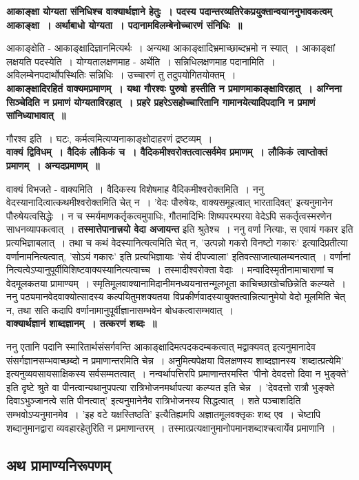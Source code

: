 	{\bfseries आकाङ्क्षा योग्यता संनिधिश्च वाक्यार्थज्ञाने हेतुः~। पदस्य पदान्तरव्यतिरेकप्रयुक्तान्वयाननुभावकत्वम् आकाङ्क्षा~। अर्थाबाधो योग्यता~। पदानामविलम्बेनोच्चारणं संनिधिः~॥}\par
		आकाङ्क्षेति - आकाङ्क्षादिज्ञानमित्यर्थः~। अन्यथा आकाङ्क्षादिभ्रमाच्छाब्दभ्रमो न स्यात्~। आकाङ्क्षां लक्षयति पदस्येति~। योग्यतालक्षणमाह - अर्थेति~। सन्निधिलक्षणमाह पदानामिति~। अविलम्बेनपदार्थोपस्थितिः सन्निधिः~। उच्चारणं तु तदुपयोगितयोक्तम्~।\\[10pt]
	{\bfseries आकाङ्क्षादिरहितं वाक्यमप्रमाणम्~। यथा गौरश्वः पुरुषो हस्तीति न प्रमाणमाकाङ्क्षाविरहात्~। अग्निना सिञ्चेदिति न प्रमाणं योग्यताविरहात्~। प्रहरे प्रहरेऽसहोच्चारितानि गामानयेत्यादिपदानि न प्रमाणं सांनिध्याभावात्~॥}\par
		गौरश्व इति~। घटः, कर्मत्वमित्यप्यनाकाङ्क्षोदाहरणं द्रष्टव्यम्~।\\[10pt]
	{\bfseries वाक्यं द्विविधम्~। वैदिकं लौकिकं च~। वैदिकमीश्वरोक्तत्वात्सर्वमेव प्रमाणम्~। लौकिकं त्वाप्तोक्तं प्रमाणम्~। अन्यदप्रमाणम्~॥}\par
		वाक्यं विभजते - वाक्यमिति~। वैदिकस्य विशेषमाह वैदिकमीश्वरोक्तमिति~। ननु वेदस्यानादित्वात्कथमीश्वरोक्तमिति चेत् न~। ’वेदः पौरुषेयः, वाक्यसमूहत्वात् भारतादिवत्’ इत्यनुमानेन पौरुषेयत्वसिद्धेः~। न च स्मर्यमाणकर्तृकत्वमुपाधिः, गौतमादिभिः शिष्यपरम्परया वेदेऽपि सकर्तृत्वस्मरणेन साधनव्यापकत्वात्~। {\bfseries तस्मात्तेपानात्त्रयो वेदा अजायन्त} इति श्रुतेश्च~। ननु वर्णा नित्याः, स एवायं गकार इति प्रत्यभिज्ञाबलात्~। तथा च कथं वेदस्यानित्यत्वमिति चेत् न, ’उत्पन्नो गकरो विनष्टो गकारः’ इत्यादिप्रतीत्या वर्णानामनित्यत्वात्, ’सोऽयं गकारः’ इति प्रत्यभिज्ञायाः ’सेयं दीपज्वाला’ इतिवत्साजात्यालम्बनत्वात्~। वर्णानां नित्यत्वेऽप्यानुपूर्वीविशिष्टवाक्यस्यानित्यत्वाच्च~। तस्मादीश्वरोक्ता वेदाः~। मन्वादिस्मृतीनामाचाराणां च वेदमूलकतया प्रामाण्यम्~। स्मृतिमूलवाक्यानामिदानीमनध्ययनात्तन्मूलभूता काचिच्छाखोचछिन्नेति कल्प्यते~। ननु पठ्यमानवेदवाक्योत्सादस्य कल्पयितुमशक्यतया विप्रकीर्णवादस्यायुक्तत्वान्नित्यानुमेयो वेदो मूलमिति चेत् न, तथा सति कदापि वर्णानामानुपूर्वीज्ञानासम्भवेन बोधकत्वासम्भवात्~।\\[10pt]
	{\bfseries वाक्यार्थज्ञानं शाब्दज्ञानम्~। तत्करणं शब्दः~॥}\par
		ननु एतानि पदानि स्मारितार्थसंसर्गवन्ति आकाङ्क्षादिमत्पदकदम्बकत्वात् मद्वाक्यवत् इत्यनुमानादेव संसर्गज्ञानसम्भवाच्छब्दो न प्रमाणान्तरमिति चेन्न~। अनुमित्यपेक्षया विलक्षणस्य शाब्दज्ञानस्य ’शब्दात्प्रत्येमि’ इत्यनुव्यवसायसाक्षिकस्य सर्वसम्मतत्वात्~। नन्वर्थापत्तिरपि प्रमाणान्तरमस्ति ’पीनो देवदत्तो दिवा न भुङ्क्ते’ इति दृष्टे श्रुते वा पीनत्वान्यथानुपपत्या रात्रिभोजनमर्थापत्या कल्प्यत इति चेन्न~। ’देवदत्तो रात्रौ भुङ्क्ते दिवाऽभुञ्जानत्वे सति पीनत्वात्’ इत्यनुमानेनैव रात्रिभोजनस्य सिद्धत्वात्~। शते पञ्चाशदिति सम्भवोऽप्यनुमानमेव~। ’इह वटे यक्षस्तिष्ठति’ इत्यैतिह्यमपि अज्ञातमूलवक्तृकः शब्द एव~। चेष्टापि शब्दानुमानद्वारा व्यवहारहेतुरिति न प्रमाणान्तरम्~। तस्मात्प्रत्यक्षानुमानोपमानशब्दाश्चत्वार्येव प्रमाणानि~। \subsection*{अथ प्रामाण्यनिरूपणम्}
